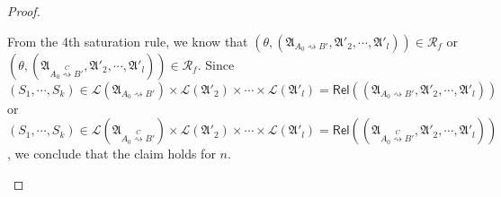 \documentclass[preprint,12pt]{elsarticle}
\newcommand\Pp{{\mathcal{P} }}
\newcommand\startactivity{{\mathsf{start} }}
\newcommand\post{{\mathsf{post} }}
\newcommand\AutReach{\mathscr{R}}
\newcommand\Rel{\mathsf{Rel}}
\newcommand\Aut{{\mathfrak{A} }}
\newcommand\Lang{{\mathscr{L} }}
\begin{document}
\begin{proof}
{\begin{itemize}
   From the 4th saturation rule, we know that $(\theta, (\Aut_{A_0 \rightsquigarrow B'}, \Aut'_2, \cdots, \Aut'_l)) \in \AutReach_f$ or $(\theta, (\Aut_{A_0 \stackrel{C}{\rightsquigarrow} B'}, \Aut'_2, \cdots, \Aut'_l)) \in \AutReach_f$. Since $(S_1, \cdots, S_k) \in \Lang(\Aut_{A_0 \rightsquigarrow B'}) \times \Lang(\Aut'_2) \times \cdots \times \Lang(\Aut'_l) = \Rel((\Aut_{A_0 \rightsquigarrow B'}, \Aut'_2, \cdots, \Aut'_l))$ or $(S_1, \cdots, S_k) \in \Lang(\Aut_{A_0 \stackrel{C}{\rightsquigarrow} B'}) \times \Lang(\Aut'_2) \times \cdots \times \Lang(\Aut'_l) = \Rel((\Aut_{A_0 \stackrel{C}{\rightsquigarrow} B'}, \Aut'_2, \cdots, \Aut'_l))$, we conclude that the claim holds for $n$. 
    
%    


\end{itemize}}
\end{proof}
\end{document}

